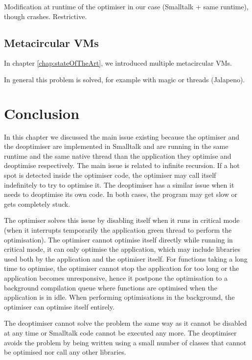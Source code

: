 \documentclass[a4paper,12pt,twoside]{../includes/ThesisStyle}
\begin{document}
Modification at runtime of the optimiser in our case (Smalltalk + same runtime), though crashes.
Restrictive.

\subsection{Metacircular VMs}

In chapter \ref{chap:stateOfTheArt}, we introduced multiple metacircular VMs. 

In general this problem is solved, for example with magic or threads (Jalapeno).


\section{Conclusion}

In this chapter we discussed the main issue existing because the optimiser and the deoptimiser are implemented in Smalltalk and are running in the same runtime and the same native thread than the application they optimise and deoptimise respectively. The main issue is related to infinite recursion. If a hot spot is detected inside the optimiser code, the optimiser may call itself indefinitely to try to optimise it. The deoptimiser has a similar issue when it needs to deoptimise its own code. In both cases, the program may get slow or gets completely stuck.

The optimiser solves this issue by disabling itself when it runs in critical mode (when it interrupts temporarily the application green thread to perform the optimisation). The optimiser cannot optimise itself directly while running in critical mode, it can only optimise the  application, which may include libraries used both by the application and the optimiser itself. For functions taking a long time to optimise, the optimiser cannot stop the application for too long or the application becomes unresponsive, hence it postpone the optimisation to a background compilation queue where functions are optimised when the application is in idle. When performing optimisations in the background, the optimiser can optimise itself entirely.

The deoptimiser cannot solve the problem the same way as it cannot be disabled at any time or Smalltalk code cannot be executed any more. The deoptimiser avoids the problem by being written using a small number of classes that cannot be optimised nor call any other libraries.

\ifx\wholebook\relax\else
    
\end{document}
